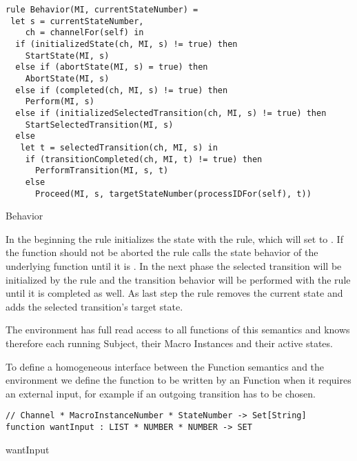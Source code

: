 \begin{listing}[H]
\begin{verbatim}
rule Behavior(MI, currentStateNumber) =
 let s = currentStateNumber,
    ch = channelFor(self) in
  if (initializedState(ch, MI, s) != true) then
    StartState(MI, s)
  else if (abortState(MI, s) = true) then
    AbortState(MI, s)
  else if (completed(ch, MI, s) != true) then
    Perform(MI, s)
  else if (initializedSelectedTransition(ch, MI, s) != true) then
    StartSelectedTransition(MI, s)
  else
   let t = selectedTransition(ch, MI, s) in
    if (transitionCompleted(ch, MI, t) != true) then
      PerformTransition(MI, s, t)
    else
      Proceed(MI, s, targetStateNumber(processIDFor(self), t))
\end{verbatim}
\caption{Behavior}
\label{lst:shortasm:Behavior}
\end{listing}


In the beginning the  rule initializes the state with the
 rule, which will set  to
. If the function should not be aborted the 
rule calls the state behavior of the underlying function until it is
.
In the next phase the selected transition will be initialized by the
 rule and the transition behavior will be performed with
the  rule until it is completed as well. As last step
the  rule removes the current state and adds the selected
transition's target state.


The environment has full read access to all functions of this semantics and knows
therefore each running Subject, their Macro Instances and their active states.

To define a homogeneous interface between the Function semantics and the environment we
define the function  to be written by an Function when it
requires an external input, for example if an outgoing transition has to be chosen.



\begin{listing}[H]
\begin{verbatim}
// Channel * MacroInstanceNumber * StateNumber -> Set[String]
function wantInput : LIST * NUMBER * NUMBER -> SET
\end{verbatim}
\caption{wantInput}
\label{lst:shortasm:wantInput}
\end{listing}


